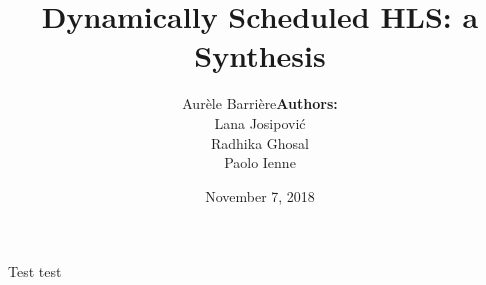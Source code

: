 \documentclass[page number]{beamer}
\def\outline{
  \begin{frame}[plain,noframenumbering]
    \frametitle{Outline}
    \tableofcontents[currentsection]
  \end{frame}
}
\begin{document}
\title{Dynamically Scheduled HLS: a Synthesis}

\author[Aur\`ele Barri\`ere]{Aur\`ele Barri\`ere\hfill\textbf{Authors:}\begin{tabular}{c}
    Lana Josipovi\'c\\
    Radhika Ghosal\\
    Paolo Ienne\\
  \end{tabular}}

\date{November 7, 2018}

\def\outline{
  \begin{frame}[plain,noframenumbering]
    \frametitle{Outline}
    \tableofcontents[currentsection]
  \end{frame}
}

\begin{frame}
  \vspace{-2cm}
  \maketitle
  \vspace{-4cm}
\end{frame}



\begin{frame}{Test}
  test
\end{frame}
    
\end{document}

